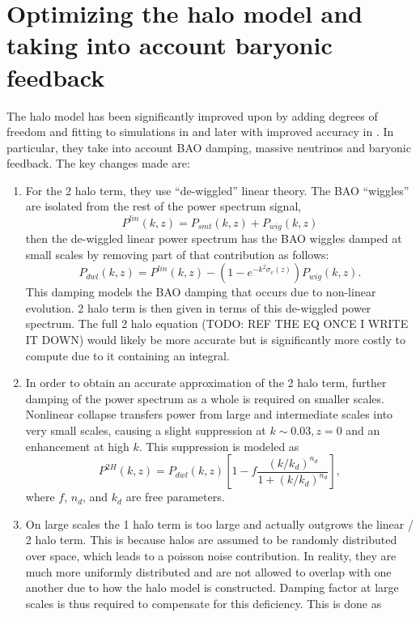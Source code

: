 \documentclass[11pt]{book}
\newcommand{\sbr}[1]{\ensuremath{\left[ #1 \right]}}
\begin{document}
\section{Optimizing the halo model and taking into account baryonic feedback}
The halo model has been significantly improved upon by adding degrees of freedom and fitting to simulations in \cite{Mead_2016} and later with improved accuracy in \cite{Mead_2021}. In particular, they take into account BAO damping, massive neutrinos and baryonic feedback. The key changes made are:
\begin{enumerate}
    \item For the 2 halo term, they use ``de-wiggled'' linear theory. The BAO ``wiggles'' are isolated from the rest of the power spectrum signal,
    \begin{equation}
        P^{lin}(k,z) = P_{smt}(k,z) + P_{wig}(k,z)
    \end{equation}
    then the de-wiggled linear power spectrum has the BAO wiggles damped at small scales by removing part of that contribution as follows:
    \begin{equation}
        P_{dwl}(k,z) = P^{lin}(k,z) - (1-e^{-k^2\sigma_{v}(z)})P_{wig}(k,z).
    \end{equation}
    This damping models the BAO damping that occurs due to non-linear evolution. 2 halo term is then given in terms of this de-wiggled power spectrum. The full 2 halo equation (TODO: REF THE EQ ONCE I WRITE IT DOWN) would likely be more accurate but is significantly more costly to compute due to it containing an integral.
    \item In order to obtain an accurate approximation of the 2 halo term, further damping of the power spectrum as a whole is required on smaller scales. Nonlinear collapse transfers power from large and intermediate scales into very small scales, causing a slight  suppression at $k\sim 0.03, z=0$ and an enhancement at high $k$. This suppression is modeled as
    \begin{equation}
        P^{2H}(k,z) = P_{dwl}(k,z)\sbr{1-f\frac{(k/k_d)^{n_d}}{1+(k/k_d)^{n_d}}},
    \end{equation}
    where $f$, $n_d$, and $k_d$ are free parameters.
    \item On large scales the 1 halo term is too large and actually outgrows the linear / 2 halo term. This is because halos are assumed to be randomly distributed over space, which leads to a poisson noise contribution. In reality, they are much more uniformly distributed and are not allowed to overlap with one another due to how the halo model is constructed. Damping factor at large scales is thus required to compensate for this deficiency. This is done as

\end{enumerate}
\end{document}
